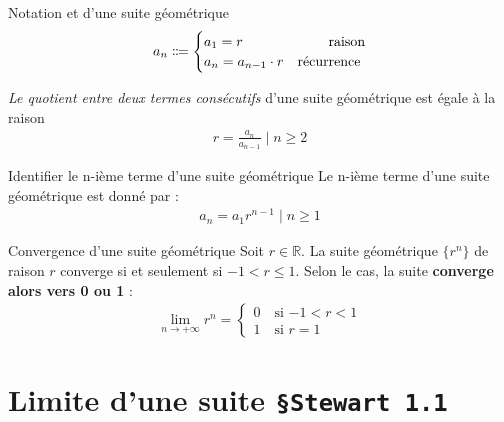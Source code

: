 \documentclass[16pt]{report}
\begin{document}
\begin{multicols*}{2}
        \begin{Syntaxe}{Notation et d'une suite géométrique}{}
        \begin{align*}
                a_n \Coloneqq 
                \begin{cases}
                    a_1 = r  &\omit\hfill raison\\  
                    a_{n} = a_{n-1} \cdot r &\omit\hfill récurrence
                \end{cases}
        \end{align*}

    \end{Syntaxe}


    \begin{note}{}{}
      \textit{Le quotient entre deux termes consécutifs} d'une suite 
      géométrique est égale à la raison 
      \begin{align*}
        r = \frac{a_n}{a_{n-1}} \; | \; n \geq 2
      \end{align*}
    \end{note}


    \begin{Concept}{Identifier le n-ième terme d'une suite géométrique}{}
        Le n-ième terme d'une suite géométrique est donné par : \\
        \begin{align*}
        a_n = a_1r^{n - 1} \; | \; n \geq 1
      \end{align*}
    \end{Concept}

    \begin{Theorem}{Convergence d'une suite géométrique}{}
        Soit $r \in \mathbb{R}$. La suite géométrique $\{r^n\}$ de raison $r$ converge si 
        et seulement si $-1 < r \leq 1$. Selon le cas, la suite 
        \textbf{converge alors vers 0 ou 1} :  
        \begin{align*}
                    \lim\limits_{n\to+\infty}r^n = 
                    \begin{cases}
                        0 \quad \text{si $-1 < r < 1$} \\
                        1 \quad \text{si $r = 1$}
                    \end{cases}
        \end{align*}

        
    \end{Theorem}

    \section{Limite d'une suite \quad \texttt{\S Stewart 1.1}  }


\end{multicols*}
\end{document}
